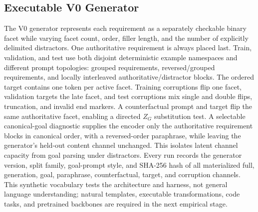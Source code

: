 \documentclass[11pt]{article}
\begin{document}
\subsection{Executable V0 Generator}
The V0 generator represents each requirement as a separately checkable binary facet while varying facet count, order, filler length, and the number of explicitly delimited distractors. One authoritative requirement is always placed last. Train, validation, and test use both disjoint deterministic example namespaces and different prompt topologies: grouped requirements, reversed/grouped requirements, and locally interleaved authoritative/distractor blocks. The ordered target contains one token per active facet. Training corruptions flip one facet, validation targets the late facet, and test corruptions mix single and double flips, truncation, and invalid end markers. A counterfactual prompt and target flip the same authoritative facet, enabling a directed $Z_G$ substitution test. A selectable canonical-goal diagnostic supplies the encoder only the authoritative requirement blocks in canonical order, with a reversed-order paraphrase, while leaving the generator's held-out content channel unchanged. This isolates latent channel capacity from goal parsing under distractors. Every run records the generator version, split family, goal-prompt style, and SHA-256 hash of all materialized full, generation, goal, paraphrase, counterfactual, target, and corruption channels. This synthetic vocabulary tests the architecture and harness, not general language understanding; natural templates, executable transformations, code tasks, and pretrained backbones are required in the next empirical stage.
\end{document}

